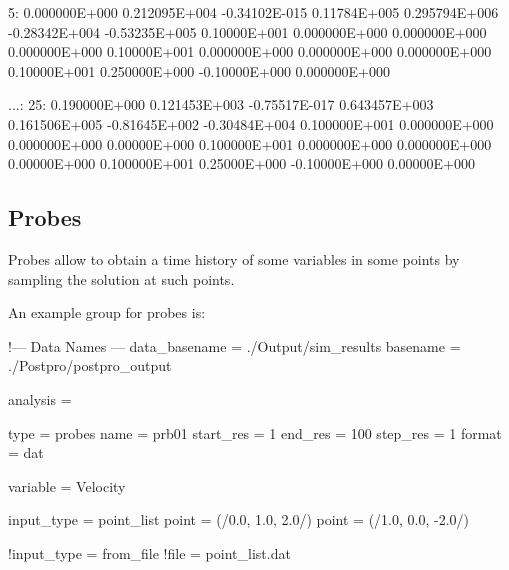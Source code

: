 \begin{inputfile}
  5: 0.000000E+000    0.212095E+004    -0.34102E-015  0.11784E+005  
     0.295794E+006    -0.28342E+004    -0.53235E+005  0.10000E+001  
     0.000000E+000    0.000000E+000    0.000000E+000  0.10000E+001  
     0.000000E+000    0.000000E+000    0.000000E+000  0.10000E+001  
     0.250000E+000    -0.10000E+000    0.000000E+000
  
...:
  25: 0.190000E+000  0.121453E+003 -0.75517E-017  0.643457E+003  
      0.161506E+005  -0.81645E+002 -0.30484E+004  0.100000E+001  
      0.000000E+000  0.000000E+000  0.00000E+000  0.100000E+001  
      0.000000E+000  0.000000E+000  0.00000E+000  0.100000E+001  
      0.25000E+000   -0.10000E+000  0.00000E+000
\end{inputfile}



\subsection{Probes}

Probes allow to obtain a time history of some variables in some points by 
sampling the solution at such points. 

An example  group for probes is:

\begin{inputfile}[frame=single, caption={dust\_post.in for probes}, 
  label={file:dust_post.in_probes}]
!--- Data Names ---
data_basename = ./Output/sim_results
basename =     ./Postpro/postpro_output

analysis = {

type = probes
name = prb01
start_res = 1
end_res   = 100 
step_res  = 1
format = dat

variable = Velocity

input_type = point_list
point = (/0.0, 1.0, 2.0/)
point = (/1.0, 0.0, -2.0/)

!input_type = from_file
!file = point_list.dat

}
\end{inputfile}

